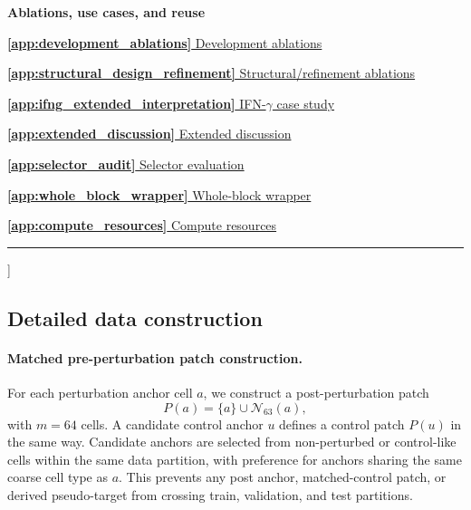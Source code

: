 \documentclass[sigconf,review,balance=false]{acmart}
\begin{document}
{\begin{minipage}{\textwidth}
\begin{minipage}{0.315\textwidth}
\end{minipage}
\hfill
\begin{minipage}{0.315\textwidth}
\raggedright\small
\textbf{Ablations, use cases, and reuse}\par
\vspace{2pt}
\hyperref[app:development_ablations]{\textbf{\ref*{app:development_ablations}} Development ablations}\par
\hyperref[app:structural_design_refinement]{\textbf{\ref*{app:structural_design_refinement}} Structural/refinement ablations}\par
\hyperref[app:ifng_extended_interpretation]{\textbf{\ref*{app:ifng_extended_interpretation}} IFN-$\gamma$ case study}\par
\hyperref[app:extended_discussion]{\textbf{\ref*{app:extended_discussion}} Extended discussion}\par
\hyperref[app:selector_audit]{\textbf{\ref*{app:selector_audit}} Selector evaluation}\par
\hyperref[app:whole_block_wrapper]{\textbf{\ref*{app:whole_block_wrapper}} Whole-block wrapper}\par
\hyperref[app:compute_resources]{\textbf{\ref*{app:compute_resources}} Compute resources}\par
\end{minipage}

\vspace{5pt}
\hrule
\end{minipage}
\vspace{4pt}
}]

\subsection{Detailed data construction}
\label{app:detailed_data_construction}

\paragraph{Matched pre-perturbation patch construction.}
For each perturbation anchor cell $a$, we construct a post-perturbation patch
\[
P(a)=\{a\}\cup\mathcal N_{63}(a),
\]
with $m=64$ cells. A candidate control anchor $u$ defines a control patch $P(u)$ in the same way. Candidate anchors are selected from non-perturbed or control-like cells within the same data partition, with preference for anchors sharing the same coarse cell type as $a$. This prevents any post anchor, matched-control patch, or derived pseudo-target from crossing train, validation, and test partitions.
\end{document}
